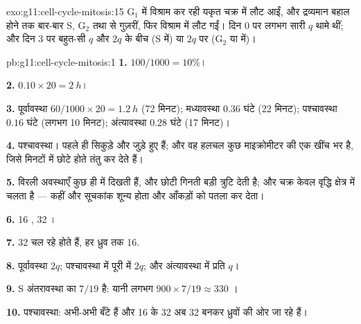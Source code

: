 \begin{solution}{exo:g11:cell-cycle-mitosis:15}
$\mathrm{G_1}$ में विश्राम कर रही यकृत  चक्र में लौट आईं, और
द्रव्यमान बहाल होने तक बार-बार S, $\mathrm{G_2}$ तथा  से
गुज़रीं, फिर विश्राम में लौट गईं। दिन 0 पर लगभग सारी  $q$ थामे
थीं; और दिन 3 पर बहुत-सी $q$ और $2q$ के बीच (S में) या $2q$ पर
($\mathrm{G_2}$ या  में)।
\end{solution}

\begin{solution}{pb:g11:cell-cycle-mitosis:1}
\textbf{1.} $100/1000 = 10\%$।

\textbf{2.} $0.10 \times 20 = \qty{2}{h}$।

\textbf{3.} पूर्वावस्था $60/1000 \times 20 = \qty{1.2}{h}$ (72 मिनट);
मध्यावस्था $0.36$ घंटे (22 मिनट); पश्चावस्था $0.16$ घंटे (लगभग 10 मिनट);
अंत्यावस्था $0.28$ घंटे (17 मिनट)।

\textbf{4.} पश्चावस्था।  पहले ही सिकुड़े और जुड़े हुए हैं; और वह
हलचल कुछ माइक्रोमीटर की एक खींच भर है, जिसे मिनटों में छोटे होते तंतु कर
देते हैं।

\textbf{5.} विरली अवस्थाएँ कुछ ही  में दिखती हैं, और छोटी गिनती
बड़ी त्रुटि देती है; और चक्र केवल वृद्धि क्षेत्र में चलता है --- कहीं और
सूचकांक शून्य होता और आँकड़ों को पतला कर देता।

\textbf{6.} 16 , 32 ।

\textbf{7.} 32  चल रहे होते हैं, हर ध्रुव तक 16.

\textbf{8.} पूर्वावस्था $2q$; पश्चावस्था में पूरी  में $2q$; और
अंत्यावस्था में प्रति  $q$।

\textbf{9.} S अंतरावस्था का $7/19$ है: यानी लगभग $900 \times 7/19 \approx
330$ ।

\textbf{10.} पश्चावस्था:  अभी-अभी बँटे हैं और 16  के
32  अब 32  बनकर ध्रुवों की ओर जा रहे हैं।


\end{solution}
